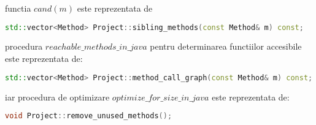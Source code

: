 functia $cand(m)$ este reprezentata de
\begin{lstlisting}[language=C++]
std::vector<Method> Project::sibling_methods(const Method& m) const;
\end{lstlisting}

procedura $reachable\_methods\_in\_java$ pentru determinarea functiilor
accesibile este reprezentata de:

\begin{lstlisting}[language=C++]
std::vector<Method> Project::method_call_graph(const Method& m) const;
\end{lstlisting}

iar procedura de optimizare $optimize\_for\_size\_in\_java$ este reprezentata de:
\begin{lstlisting}[language=C++]
void Project::remove_unused_methods();
\end{lstlisting}
